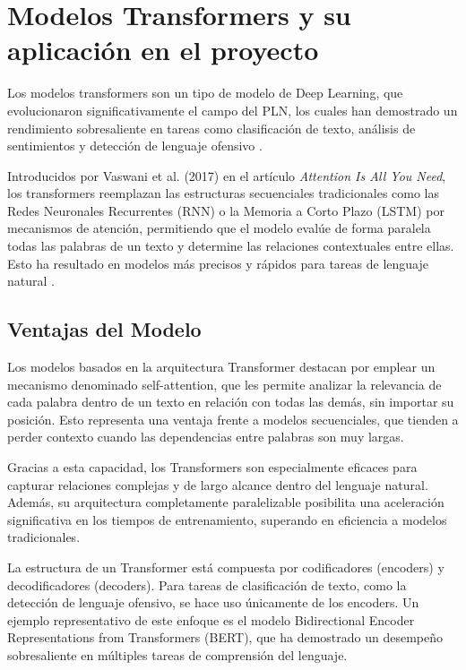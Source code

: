 \chapter{Modelos Transformers y su aplicación en el proyecto}

Los modelos transformers son un tipo de modelo de Deep Learning, que evolucionaron significativamente el campo del PLN, los cuales han demostrado un rendimiento sobresaliente en tareas como clasificación de texto, análisis de sentimientos y detección de lenguaje ofensivo \cite{ibm2025transformer}.

Introducidos por Vaswani et al. (2017) en el artículo \textit{Attention Is All You Need}, los transformers reemplazan las estructuras secuenciales tradicionales como las Redes Neuronales Recurrentes (RNN) o la Memoria a Corto Plazo (LSTM) por mecanismos de atención, permitiendo que el modelo evalúe de forma paralela todas las palabras de un texto y determine las relaciones contextuales entre ellas. Esto ha resultado en modelos más precisos y rápidos para tareas de lenguaje natural \cite{vaswani2017attention}.

\section{Ventajas del Modelo}

Los modelos basados en la arquitectura Transformer destacan por emplear un mecanismo denominado self-attention, que les permite analizar la relevancia de cada palabra dentro de un texto en relación con todas las demás, sin importar su posición. Esto representa una ventaja frente a modelos secuenciales, que tienden a perder contexto cuando las dependencias entre palabras son muy largas.

Gracias a esta capacidad, los Transformers son especialmente eficaces para capturar relaciones complejas y de largo alcance dentro del lenguaje natural. Además, su arquitectura completamente paralelizable posibilita una aceleración significativa en los tiempos de entrenamiento, superando en eficiencia a modelos tradicionales.

La estructura de un Transformer está compuesta por codificadores (encoders) y decodificadores (decoders). Para tareas de clasificación de texto, como la detección de lenguaje ofensivo, se hace uso únicamente de los encoders. Un ejemplo representativo de este enfoque es el modelo Bidirectional Encoder Representations from Transformers (BERT), que ha demostrado un desempeño sobresaliente en múltiples tareas de comprensión del lenguaje.

